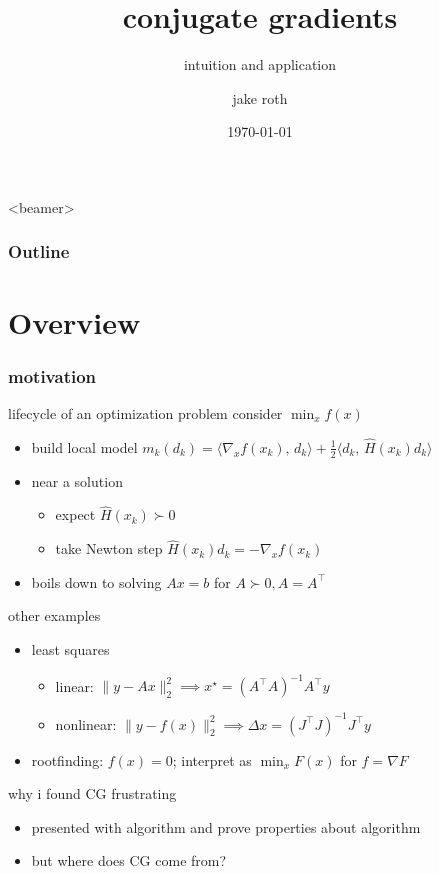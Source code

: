 \documentclass[10pt,dvipsnames*]{beamer}
\title{conjugate gradients}
\subtitle{intuition and application}
\author{jake roth}
\date{\today}
\begin{document}
%
\begin{frame}[plain]
  \titlepage
\end{frame}
%
\begin{frame}<beamer>
  \frametitle{Outline}
  \tableofcontents
\end{frame}
%
\section{Overview}
\label{sec:overview}
%
\begin{frame}
  \frametitle{motivation}
  \pause
  \begin{block}{lifecycle of an optimization problem}
    consider $\min_x f(x)$
    \begin{itemize}
      \item build local model $m_k(d_k) = \langle \nabla_x f(x_k),\, d_k \rangle + \tfrac 12 \langle d_k,\, \hat{H}(x_k) d_k \rangle$
      \item near a solution
      \begin{itemize}
        \item expect $\hat{H}(x_k) \succ 0$
        \item take Newton step $\hat{H}(x_k) d_k = -\nabla_x f(x_k)$
      \end{itemize}
      \item boils down to solving $Ax = b$ for $A \succ 0, A=A^{\top}$
    \end{itemize}
  \end{block}
  \pause
  \begin{block}{other examples}
    \begin{itemize}
      \item least squares
      \begin{itemize}
        \item linear: $\|y - Ax\|_2^2 \implies x^{\star} = (A^{\top}A)^{-1}A^{\top}y$
        \item nonlinear: $\|y - f(x)\|_2^2 \implies \Delta x = (J^{\top}J)^{-1}J^{\top}y$
      \end{itemize}
      \item rootfinding: $f(x) = 0$; interpret as $\min_x F(x)$ for $f = \nabla F$
    \end{itemize}
  \end{block}
  \pause
  \begin{block}{why i found CG frustrating}
    \begin{itemize}
      \item presented with algorithm and prove properties about algorithm
      \item but where does CG \alert{come from}?
    \end{itemize}
  \end{block}
\end{frame}
\end{document}
